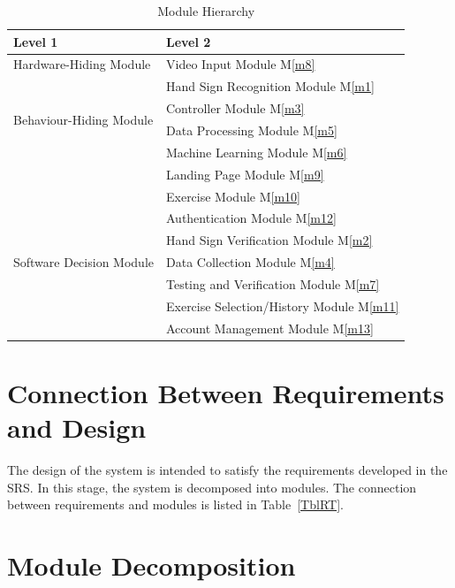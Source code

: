 \documentclass[12pt, titlepage]{article}
\newcommand{\mref}[1]{M\ref{#1}}
\begin{document}
\begin{table}[h!]
\centering
\begin{tabular}{p{} p{}}
\toprule
\textbf{Level 1} & \textbf{Level 2}\\
\midrule

\multirow{1}{0.3\textwidth}{Hardware-Hiding Module} 
& Video Input Module \mref{m8}\\
\midrule

\multirow{4}{0.3\textwidth}{Behaviour-Hiding Module} 
& Hand Sign Recognition Module \mref{m1}\\
& Controller Module \mref{m3}\\
& Data Processing Module \mref{m5}\\
& Machine Learning Module \mref{m6}\\
& Landing Page Module \mref{m9}\\
& Exercise Module \mref{m10}\\
& Authentication Module \mref{m12}\\
\midrule

\multirow{3}{0.3\textwidth}{Software Decision Module} 
& Hand Sign Verification Module \mref{m2}\\
& Data Collection Module \mref{m4}\\
& Testing and Verification Module \mref{m7}\\
& Exercise Selection/History Module \mref{m11}\\
& Account Management Module \mref{m13}\\
\bottomrule

\end{tabular}
\caption{Module Hierarchy}
\label{TblMH}
\end{table}

\section{Connection Between Requirements and Design} \label{SecConnection}

The design of the system is intended to satisfy the requirements developed in
the SRS. In this stage, the system is decomposed into modules. The connection
between requirements and modules is listed in Table~\ref{TblRT}.

\section{Module Decomposition} \label{SecMD}
\end{document}
